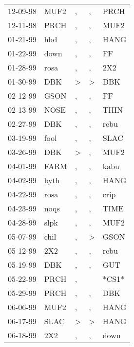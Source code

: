 \begin{supertabular}{lllll}
 12-09-98 &   MUF2 &                , &                , &   PRCH \\
 12-11-98 &   PRCH &                , &                , &   MUF2 \\
 01-21-99 &    hbd &                , &                , &   HANG \\
 01-22-99 &   down &                , &                , &     FF \\
 01-28-99 &   rosa &                , &                , &    2X2 \\
 01-30-99 &    DBK &     \textgreater &     \textgreater &    DBK \\
 02-12-99 &   GSON &                , &                , &     FF \\
 02-13-99 &   NOSE &                , &                , &   THIN \\
 02-27-99 &    DBK &                , &                , &   rebu \\
 03-19-99 &   fool &                , &                , &   SLAC \\
 03-26-99 &    DBK &     \textgreater &                , &   MUF2 \\
 04-01-99 &   FARM &                , &                , &   kabu \\
 04-02-99 &   byth &                , &                , &   HANG \\
 04-22-99 &   rosa &                , &                , &   crip \\
 04-23-99 &   noqs &                , &                , &   TIME \\
 04-28-99 &   slpk &                , &                , &   MUF2 \\
 05-07-99 &   chil &                , &     \textgreater &   GSON \\
 05-12-99 &    2X2 &                , &                , &   rebu \\
 05-19-99 &    DBK &                , &                , &    GUT \\
 05-22-99 &   PRCH &                , &                  &  *CS1* \\
 05-29-99 &   PRCH &                , &                , &    DBK \\
 06-06-99 &   MUF2 &                , &                , &   HANG \\
 06-17-99 &   SLAC &     \textgreater &     \textgreater &   HANG \\
 06-18-99 &    2X2 &                , &                , &   down \\

\end{supertabular}
